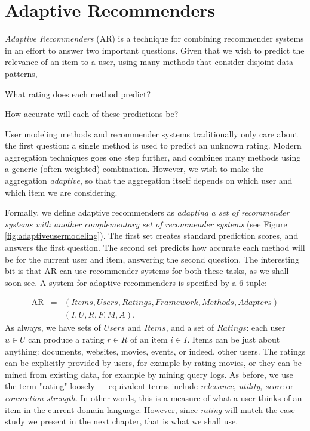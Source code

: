 \section{Adaptive Recommenders}
\label{sec:usermetamodeling}

\emph{Adaptive Recommenders} (AR) is a technique for combining recommender systems
in an effort to answer two important questions.
Given that we wish to predict the relevance of an item to a user,
using many methods that consider disjoint data patterns,

\begin{enumerate*}
  \item What rating does each method predict?
  \item How accurate will each of these predictions be?
\end{enumerate*}

User modeling methods and recommender systems traditionally only care about the first question:
a single method is used to predict an unknown rating.
Modern aggregation techniques goes one step further, and combines many methods using a generic (often weighted) combination.
However, we wish to make the aggregation \emph{adaptive},
so that the aggregation itself depends on which user and which item we are considering.

Formally, we define adaptive recommenders as \emph{adapting a set of recommender systems
with another complementary set of recommender systems} 
(see Figure \ref{fig:adaptiveusermodeling}).
The first set creates standard prediction scores, and answers the first question.
The second set predicts how accurate each method will be for the current user and item,
answering the second question.
The interesting bit is that AR can use recommender systems for both these tasks, as we shall soon see.
A system for adaptive recommenders is specified by a 6-tuple:

\begin{eqnarray*}
  \mathrm{AR} &=& (Items, Users, Ratings, Framework, Methods, Adapters)\\
              &=& (I,U,R,F,M,A).
\end{eqnarray*}
%
As always, we have sets of $Users$ and $Items$, 
and a set of $Ratings$: each user $u \in U$ can produce a rating $r \in R$ of an item $i \in I$.
Items can be just about anything: documents, websites, movies, events, or indeed, other users.
The ratings can be explicitly provided by users, for example by rating movies,
or they can be mined from existing data, for example by mining query logs.
As before, we use the term "rating" loosely --- equivalent terms include \emph{relevance}, \emph{utility},
\emph{score} or \emph{connection strength}. In other words, this is a measure of what a user thinks of an item
in the current domain language. However, since \emph{rating} will match the case study we present in the next chapter,
that is what we shall use. 

